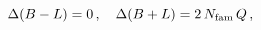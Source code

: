 \begin{equation}
\Delta(B-L) = 0\,,\quad \Delta(B+L) = 2\, N_{\rm fam} \, Q \,, \label{DBL}
\end{equation}

